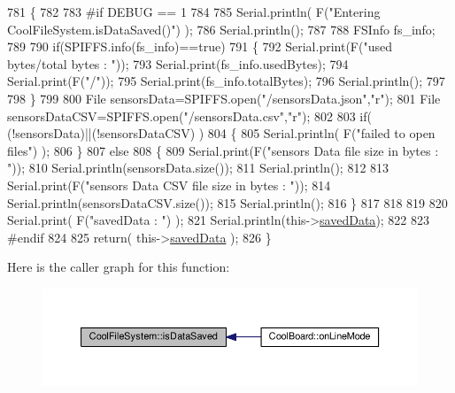 \begin{DoxyCode}
781 \{
782 
783 \textcolor{preprocessor}{#if DEBUG == 1 }
784 
785     Serial.println( F(\textcolor{stringliteral}{"Entering CoolFileSystem.isDataSaved()"}) );
786     Serial.println();
787 
788     FSInfo fs\_info;
789 
790     \textcolor{keywordflow}{if}(SPIFFS.info(fs\_info)==\textcolor{keyword}{true})
791     \{
792         Serial.print(F(\textcolor{stringliteral}{"used bytes/total bytes : "}));   
793         Serial.print(fs\_info.usedBytes);
794         Serial.print(F(\textcolor{stringliteral}{"/"}));
795         Serial.print(fs\_info.totalBytes);
796         Serial.println();
797 
798     \}
799 
800     File sensorsData=SPIFFS.open(\textcolor{stringliteral}{"/sensorsData.json"},\textcolor{stringliteral}{"r"});
801     File sensorsDataCSV=SPIFFS.open(\textcolor{stringliteral}{"/sensorsData.csv"},\textcolor{stringliteral}{"r"});
802     
803     \textcolor{keywordflow}{if}( (!sensorsData)||(!sensorsDataCSV) ) 
804     \{
805         Serial.println( F(\textcolor{stringliteral}{"failed to open files"}) );        
806     \}
807     \textcolor{keywordflow}{else}
808     \{       
809             Serial.print(F(\textcolor{stringliteral}{"sensors Data file size in bytes : "}));
810             Serial.println(sensorsData.size());
811             Serial.println();
812             
813             Serial.print(F(\textcolor{stringliteral}{"sensors Data CSV file size in bytes : "}));              
814             Serial.println(sensorsDataCSV.size());
815             Serial.println();
816     \}
817 
818 
819 
820     Serial.print( F(\textcolor{stringliteral}{"savedData : "}) );
821     Serial.println(this->\hyperlink{class_cool_file_system_ad9f5b739a32100f5f21270c3d9ee2b1d}{savedData});
822 
823 \textcolor{preprocessor}{#endif}
824 
825     \textcolor{keywordflow}{return}( this->\hyperlink{class_cool_file_system_ad9f5b739a32100f5f21270c3d9ee2b1d}{savedData} );
826 \}
\end{DoxyCode}
Here is the caller graph for this function\+:\nopagebreak
\begin{figure}[H]
\begin{center}
\leavevmode
\includegraphics[width=350pt]{db/d0c/class_cool_file_system_ac86a40e7c3a1842f7342f698d34324f9_icgraph}
\end{center}
\end{figure}
\mbox{\label{class_cool_file_system_afa3a4feae94871d4d3b6bebb701c2e67}} 
